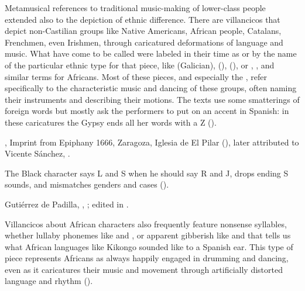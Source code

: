
Metamusical references to traditional music-making of lower-class people
extended also to the depiction of ethnic difference.
There are villancicos that depict non-Castilian groups like Native Americans,
African people, Catalans, Frenchmen, even Irishmen, through caricatured
deformations of language and music.%
    \Autocites
    {Baker:EthnicVC}
    {Baker:PerformancePostColonial}
    {Davies:LocalContent}
    {AlvesSimao:VillancicosDeNegros}
    {Molinero:Negros}
    {Santamaria:Negrillas}
    {Goldberg:SonidosNegros}
What have come to be called  were labeled in their
time as  or by the name of the particular ethnic
type for that piece, like  (Galician), 
(),  (), or ,
, and similar terms for Africans.
Most of these pieces, and especially the , refer
specifically to the characteristic music and dancing of these groups, often
naming their instruments and describing their motions.
The texts use some smatterings of foreign words but mostly ask the performers
to put on an accent in Spanish: in these caricatures the Gypsy ends all her
words with a Z ().
\begin{Footnote}
    , Imprint from Epiphany 1666, Zaragoza,
    Iglesia de El Pilar (), later attributed to Vicente
    Sánchez, .
\end{Footnote}
The Black character says L and S when he should say R and J, drops ending S
sounds, and mismatches genders and cases ().%
\begin{Footnote}
    Gutiérrez de Padilla, ,
    ; edited in \autocite{Cashner:WLSCM32}.
\end{Footnote}
Villancicos about African characters also frequently feature nonsense
syllables, whether lullaby phonemes like  and , or apparent gibberish like  and
 that tells us what African languages like Kikongo
sounded like to a Spanish ear.
This type of piece represents Africans as always happily engaged in drumming
and dancing, even as it caricatures their music and movement through
artificially distorted language and rhythm
().

